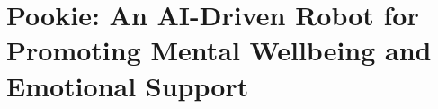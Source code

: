 \section*{Pookie: An AI-Driven Robot for Promoting Mental Wellbeing and Emotional Support}
\label{sec:topic}

